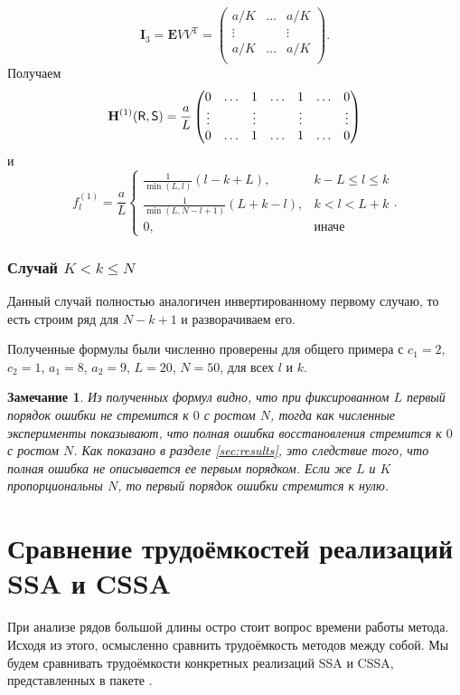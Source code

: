 \documentclass[specialist,
               substylefile = spbu.rtx,
               subf,href,colorlinks=true, 12pt]{disser}
\newtheorem{remark}{Замечание}
\begin{document}
$$\mathbf{I}_3 = \mathbf{E} V V^{\mathrm{T}} = \begin{pmatrix}
	a/K &  \ldots & a/K\\
	\vdots & & \vdots\\
	a/K &  \ldots & a/K\\
\end{pmatrix}.$$
Получаем
$$\mathbf{H}^{(1)}(\textsf{R}, \textsf{S}) = \frac{a}{L}\begin{pmatrix}
	0 & \ldots & 1 & \ldots & 1 & \ldots & 0\\
	\vdots & & \vdots & & \vdots & & \vdots\\
	0 & \ldots & 1 & \ldots & 1 & \ldots & 0
\end{pmatrix}$$
и
$$f^{(1)}_l = \frac{a}{{L}}
\begin{cases}
	\frac{1}{\min(L, l)}(l - k + L), & \text{$k - L \leq l \leq k$}\\
	\frac{1}{\min(L, N - l + 1)}(L + k - l), & \text{$k < l < L + k$}\\
	0, & \text{иначе}
\end{cases}.$$


\subsubsection{Случай $K < k \leq N$}
Данный случай полностью аналогичен инвертированному первому случаю, то есть строим ряд для $N - k + 1$ и разворачиваем его.

\vspace{1em}
Полученные формулы были численно проверены для общего примера с $c_1 = 2$, $c_2 = 1$, $a_1 = 8$, $a_2 = 9$, $L = 20$, $N = 50$, для всех $l$ и $k$.

\begin{remark}
	Из полученных формул видно, что при фиксированном $L$ первый порядок ошибки не стремится к $0$ с ростом $N$, тогда как численные эксперименты показывают, что полная ошибка восстановления стремится к $0$ с ростом $N$. Как показано в разделе \ref{sec:results}, это следствие того, что полная ошибка не описывается ее первым порядком. Если же $L$ и $K$ пропорциональны $N$, то первый порядок ошибки стремится к нулю.
\end{remark}

\section{Сравнение трудоёмкостей реализаций SSA и CSSA}
При анализе рядов большой длины остро стоит вопрос времени работы метода. Исходя из этого, осмысленно сравнить трудоёмкость методов между собой. Мы будем сравнивать трудоёмкости конкретных реализаций SSA и CSSA, представленных в пакете \cite{Korobeynikov.etal2014}.
\end{document}
